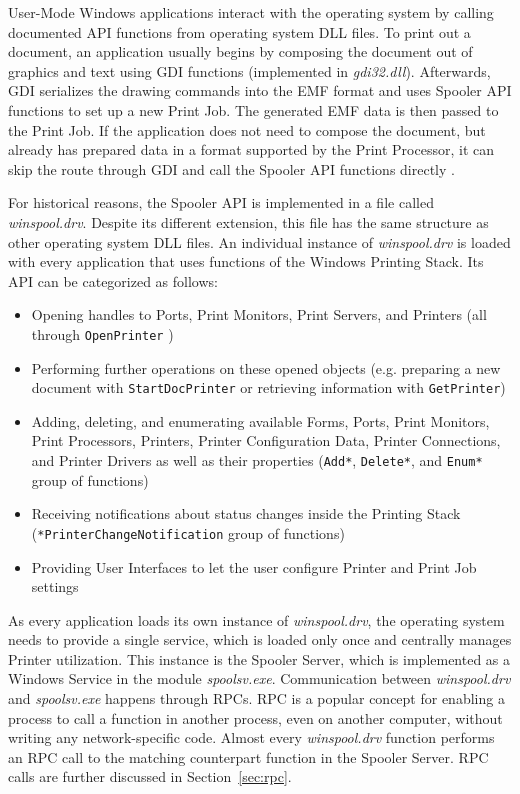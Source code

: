 User-Mode Windows applications interact with the operating system by calling documented \gls{API} functions from operating system \gls{DLL} files.
To print out a document, an application usually begins by composing the document out of graphics and text using \gls{GDI} functions (implemented in \emph{gdi32.dll}).
Afterwards, \gls{GDI} serializes the drawing commands into the \gls{EMF} format and uses Spooler \gls{API} functions to set up a new Print Job.
The generated \gls{EMF} data is then passed to the Print Job.
If the application does not need to compose the document, but already has prepared data in a format supported by the Print Processor, it can skip the route through \gls{GDI} and call the Spooler \gls{API} functions directly \cite{yuan2001windows}.

For historical reasons, the Spooler \gls{API} is implemented in a file called \emph{winspool.drv}.
Despite its different extension, this file has the same structure as other operating system \gls{DLL} files.
An individual instance of \emph{winspool.drv} is loaded with every application that uses functions of the Windows Printing Stack.
Its \gls{API} can be categorized as follows:

\begin{itemize}
	\item Opening handles to Ports, Print Monitors, Print Servers, and Printers (all through \texttt{OpenPrinter} \cite{msdn2015openprinter})
	\item Performing further operations on these opened objects (e.g. preparing a new document with \texttt{StartDocPrinter} or retrieving information with \texttt{GetPrinter})
	\item Adding, deleting, and enumerating available Forms, Ports, Print Monitors, Print Processors, Printers, Printer Configuration Data, Printer Connections, and Printer Drivers as well as their properties (\texttt{Add*}, \texttt{Delete*}, and \texttt{Enum*} group of functions)
	\item Receiving notifications about status changes inside the Printing Stack \\ (\texttt{*PrinterChangeNotification} group of functions)
	\item Providing User Interfaces to let the user configure Printer and Print Job settings
\end{itemize}

As every application loads its own instance of \emph{winspool.drv}, the operating system needs to provide a single service, which is loaded only once and centrally manages Printer utilization.
This instance is the Spooler Server, which is implemented as a Windows Service in the module \emph{spoolsv.exe}.
Communication between \emph{winspool.drv} and \emph{spoolsv.exe} happens through \glspl{RPC}.
\gls{RPC} is a popular concept for enabling a process to call a function in another process, even on another computer, without writing any network-specific code.
Almost every \emph{winspool.drv} function performs an \gls{RPC} call to the matching counterpart function in the Spooler Server.
\gls{RPC} calls are further discussed in Section~\ref{sec:rpc}.


